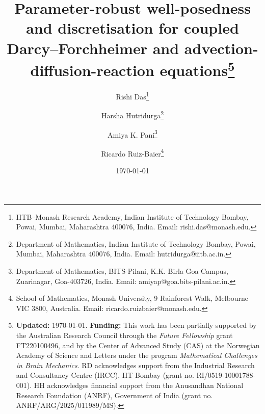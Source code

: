 \documentclass[11pt, reqno, a4paper, twoside]{article}
\numberwithin{equation}{section}
\numberwithin{remark}{section}
\numberwithin{figure}{section}
\numberwithin{table}{section}
\begin{document}
    

\pagestyle{fancy}

\title{Parameter-robust well-posedness and discretisation for coupled Darcy--Forchheimer and advection-diffusion-reaction equations\thanks{\textbf{Updated:} \today. \textbf{Funding:} This work has been partially supported by  the Australian Research Council through the \textit{Future Fellowship} grant FT220100496, and by the Center of Advanced Study (CAS) at the Norwegian Academy of Science and Letters under the program \textit{Mathematical Challenges in Brain Mechanics}. RD acknowledges support from the Industrial Research and Consultancy Centre (IRCC), IIT Bombay (grant no. RI/0519-10001788-001). HH acknowledges financial support from the Anusandhan National Research Foundation (ANRF), Government of India (grant no. ANRF/ARG/2025/011989/MS).}}




\author{Rishi Das\thanks{
IITB–Monash Research Academy, Indian Institute of Technology Bombay, Powai, Mumbai, Maharashtra 400076, India. Email: rishi.das@monash.edu.} 
\and  Harsha Hutridurga\thanks{Department of Mathematics, Indian Institute of Technology Bombay, Powai, Mumbai, Maharashtra 400076, India. Email: hutridurga@iitb.ac.in.}
\and Amiya K. Pani\thanks{Department of Mathematics, BITS-Pilani, K.K. Birla Goa Campus, Zuarinagar, Goa-403726, India. Email: amiyap@goa.bits-pilani.ac.in.}
\and Ricardo Ruiz-Baier\thanks{School of Mathematics, Monash University, 9 Rainforest Walk, Melbourne VIC 3800, Australia. Email: ricardo.ruizbaier@monash.edu.}}
\date{\today}



\maketitle
\end{document}
